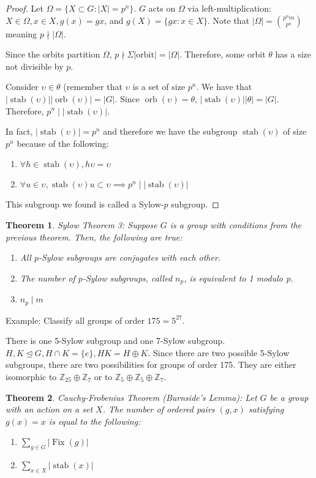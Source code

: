 \documentclass{article}
\theoremstyle{definition}
\theoremstyle{plain}
\newtheorem{theorem}{Theorem}
\theoremstyle{corollary}
\theoremstyle{lemma}
\DeclareMathOperator{\orb}{orb}
\DeclareMathOperator{\stab}{stab}
\DeclareMathOperator{\Fix}{Fix}
\begin{document}
\begin{proof}
    Let $\Omega=\{X\subset G:|X|=p^n\}$. $G$ acts on $\Omega$ via left-multiplication: $X\in\Omega,x\in X,g(x)=gx$, and $g(X)=\{gx:x\in X\}$. Note that $|\Omega|=\binom{p^nm}{p^n}$ meaning $p\nmid|\Omega|$.

    Since the orbits partition $\Omega$, $p\nmid \Sigma|\text{orbit}|=|\Omega|$. Therefore, some orbit $\theta$ has a size not divisible by $p$.

    Consider $\upsilon\in\theta$ (remember that $\upsilon$ is a set of size $p^n$. We have that $|\stab(\upsilon)||\orb(\upsilon)|=|G|$. Since $\orb(\upsilon)=\theta$, $|\stab(\upsilon)||\theta|=|G|$. Therefore, $p^n\mid|\stab(\upsilon)|$. 

    In fact, $|\stab(\upsilon)|=p^n$ and therefore we have the subgroup $\stab(\upsilon)$ of size $p^n$ because of the following:
    \begin{enumerate}
        \item $\forall h\in\stab(\upsilon),h\upsilon=\upsilon$
        \item $\forall u\in\upsilon,\stab(\upsilon)u\subset\upsilon\implies p^n\mid|\stab(\upsilon)|$
    \end{enumerate}
    This subgroup we found is called a Sylow-$p$ subgroup.
\end{proof}

\begin{theorem}
    Sylow Theorem 3: Suppose $G$ is a group with conditions from the previous theorem. Then, the following are true:
    \begin{enumerate}
        \item All $p$-Sylow subgroups are conjugates with each other.
        \item The number of $p$-Sylow subgroups, called $n_p$, is equivalent to 1 modulo p.
        \item $n_p\mid m$
    \end{enumerate}
\end{theorem}

Example: Classify all groups of order $175=5^27$.

There is one 5-Sylow subgroup and one 7-Sylow subgroup. $H,K\unlhd G,H\cap K=\{e\},HK=H\oplus K$. Since there are two possible 5-Sylow subgroups, there are two possibilities for groups of order 175. They are either isomorphic to $\mathbb{Z}_{25}\oplus\mathbb Z_7$ or to $\mathbb{Z}_5\oplus\mathbb{Z}_5\oplus\mathbb{Z}_7$.

\begin{theorem}
    Cauchy-Frobenius Theorem (Burnside's Lemma): Let $G$ be a group with an action on a set $X$. The number of ordered pairs $(g,x)$ satisfying $g(x)=x$ is equal to the following: \begin{enumerate}
        \item $\sum_{g\in G}|\Fix(g)|$
        \item $\sum_{x\in X}|\stab(x)|$
    \end{enumerate}
\end{theorem}
\end{document}
